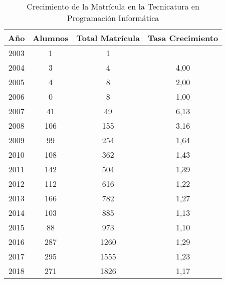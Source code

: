 \begin{table}[!htbp]
    \centering
    \begin{tabular}{|c|c|c|c|}
    \hline
    Año & Alumnos & Total Matrícula & Tasa Crecimiento \\
    \hline
    2003 & 1 & 1 & \\
    \hline
    2004 & 3 & 4 & 4,00 \\
    \hline
    2005 & 4 & 8 & 2,00 \\
    \hline
    2006 & 0 & 8 & 1,00 \\
    \hline
    2007 & 41 & 49 & 6,13 \\
    \hline
    2008 & 106 & 155 & 3,16 \\
    \hline
    2009 & 99 & 254 & 1,64 \\
    \hline
    2010 & 108 & 362 & 1,43 \\
    \hline
    2011 & 142 & 504 & 1,39 \\ 
    \hline
    2012 & 112 & 616 & 1,22 \\
    \hline
    2013 & 166 & 782 & 1,27 \\
    \hline
    2014 & 103 & 885 & 1,13 \\
    \hline
    2015 & 88 & 973 & 1,10 \\
    \hline
    2016 & 287 & 1260 & 1,29 \\
    \hline
    2017 & 295 & 1555 & 1,23 \\
    \hline
    2018 & 271 & 1826 & 1,17 \\
    \hline
    \end{tabular}
    \caption{Crecimiento de la Matrícula en la Tecnicatura en Programación Informática}
    \label{tab:tabla_planes}
\end{table}

